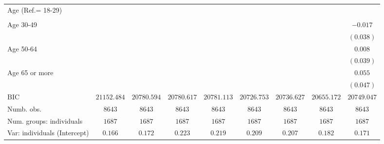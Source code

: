 \documentclass[
  12pt,
]{article}
\begin{document}
\begin{table}
\begin{center}
{\begin{tabular}{l c c c c c c c c}
Age (Ref.= 18-29)                                     &               &                &                &                &                &                &                &                \\
                                                      &               &                &                &                &                &                &                &                \\
\quad Age 30-49                                       &               &                &                &                &                &                &                & $-0.017$       \\
                                                      &               &                &                &                &                &                &                & $(0.038)$      \\
\quad Age 50-64                                       &               &                &                &                &                &                &                & $0.008$        \\
                                                      &               &                &                &                &                &                &                & $(0.039)$      \\
\quad Age 65 or more                                  &               &                &                &                &                &                &                & $0.055$        \\
                                                      &               &                &                &                &                &                &                & $(0.047)$      \\
\hline
BIC                                                   & $21152.484$   & $20780.594$    & $20780.617$    & $20781.113$    & $20726.753$    & $20736.627$    & $20655.172$    & $20749.047$    \\
Numb. obs.                                            & $8643$        & $8643$         & $8643$         & $8643$         & $8643$         & $8643$         & $8643$         & $8643$         \\
Num. groups: individuals                              & $1687$        & $1687$         & $1687$         & $1687$         & $1687$         & $1687$         & $1687$         & $1687$         \\
Var: individuals (Intercept)                          & $0.166$       & $0.172$        & $0.223$        & $0.219$        & $0.209$        & $0.207$        & $0.182$        & $0.171$        \\

\end{tabular}}
\end{center}
\end{table}
\end{document}
